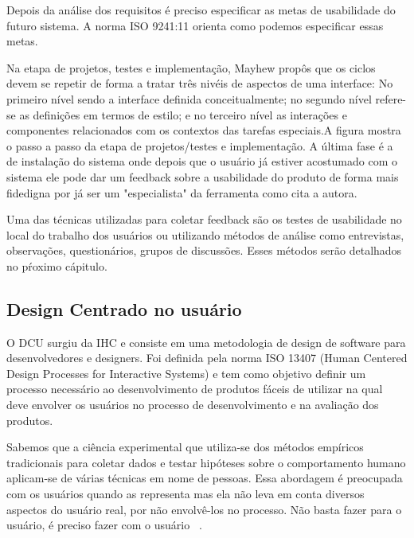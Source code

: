 
	Depois da análise dos requisitos é preciso especificar as metas de usabilidade do futuro sistema. A norma ISO 9241:11 orienta como podemos especificar essas metas.


	Na etapa de projetos, testes e implementação, Mayhew propôs que os ciclos devem se repetir de forma a tratar três nivéis de aspectos de uma interface: No primeiro nível sendo a interface definida conceitualmente; no segundo nível refere-se as definições em termos de estilo; e no terceiro nível as interações e componentes relacionados com os contextos das tarefas especiais.A figura mostra o passo a passo da etapa de projetos/testes e implementação.
	A última fase é a de instalação do sistema onde depois que o usuário já estiver acostumado com o sistema ele pode dar um feedback sobre a usabilidade do produto de forma mais fidedigna por já ser um "especialista" da ferramenta como cita a autora. 


	Uma das técnicas utilizadas para coletar feedback são os testes de usabilidade no local do trabalho dos usuários ou utilizando métodos de análise como entrevistas, observações, questionários, grupos de discussões. Esses métodos serão detalhados no pŕoximo cápitulo.


\subsection{Design Centrado no usuário}

O DCU surgiu da IHC e consiste em uma metodologia de design de software para desenvolvedores e designers. Foi definida pela norma ISO 13407 (Human Centered Design Processes for Interactive Systems) e tem como objetivo definir um processo necessário ao desenvolvimento de produtos fáceis de utilizar na qual deve envolver os usuários no processo de desenvolvimento e na avaliação dos produtos.

Sabemos que a ciência experimental que utiliza-se dos métodos empíricos tradicionais para coletar dados e testar hipóteses sobre o comportamento humano aplicam-se de várias técnicas em nome de pessoas. Essa abordagem é preocupada com os usuários quando as representa mas ela não leva em conta diversos aspectos do usuário real, por não envolvê-los no processo. Não basta fazer para o usuário, é preciso fazer com o usuário ~\cite{eason1995}. 

